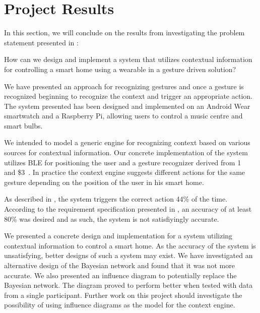 \section{Project Results}
\label{sec:results}

In this section, we will conclude on the results from investigating the problem statement presented in :

\begin{framed}
\noindent How can we design and implement a system that utilizes contextual information for controlling a smart home using a wearable in a gesture driven solution?
\end{framed}

We have presented an approach for recognizing gestures and once a gesture is recognized beginning to recognize the context and trigger an appropriate action. The system presented has been designed and implemented on an Android Wear smartwatch and a Raspberry Pi, allowing users to control a music centre and smart bulbs.

We intended to model a generic engine for recognizing context based on various sources for contextual information. Our concrete implementation of the system utilizes BLE for positioning the user and a gesture recognizer derived from 1\textcent~\cite{herold20121} and \$3~\cite{threedollar}. In practice the context engine suggests different actions for the same gesture depending on the position of the user in his smart home.

As described in , the system triggers the correct action 44\% of the time. According to the requirement specification presented in , an accuracy of at least 80\% was desired and as such, the system is not satisfiyingly accurate.

We presented a concrete design and implementation for a system utilizing contextual information to control a smart home. As the accuracy of the system is unsatisfying, better designs of such a system may exist. We have investigated an alternative design of the Bayesian network and found that it was not more accurate.
We also presented an influence diagram to potentially replace the Bayesian network. The diagram proved to perform better when tested with data from a single participant.
Further work on this project should investigate the possibility of using influence diagrams as the model for the context engine.

